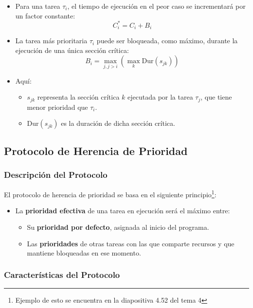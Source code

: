 \documentclass[a4paper,12pt]{article}
\begin{document}
\begin{itemize}
    \item Para una tarea \(\tau_i\), el tiempo de ejecución en el peor caso se incrementará por un factor constante:
    \[
    C_i^* = C_i + B_i
    \]
    \item La tarea más prioritaria \(\tau_i\) puede ser bloqueada, como máximo, durante la ejecución de una única sección crítica:
    \[
    B_i = \max_{j, j > i} \left( \max_k \text{Dur}(s_{jk}) \right)
    \]
    \item Aquí:
    \begin{itemize}
        \item \(s_{jk}\) representa la sección crítica \(k\) ejecutada por la tarea \(\tau_j\), que tiene menor prioridad que \(\tau_i\).
        \item \(\text{Dur}(s_{jk})\) es la duración de dicha sección crítica.
    \end{itemize}
\end{itemize}

\subsection{Protocolo de Herencia de Prioridad}

\subsubsection{Descripción del Protocolo}

El protocolo de herencia de prioridad se basa en el siguiente principio\footnote{Ejemplo de esto se encuentra en la diapositiva 4.52 del tema 4}:

\begin{itemize}
    \item La \textbf{prioridad efectiva} de una tarea en ejecución será el máximo entre:
    \begin{itemize}
        \item Su \textbf{prioridad por defecto}, asignada al inicio del programa.
        \item Las \textbf{prioridades} de otras tareas con las que comparte recursos y que mantiene bloqueadas en ese momento.
    \end{itemize}
\end{itemize}

\subsubsection{Características del Protocolo}
\end{document}
